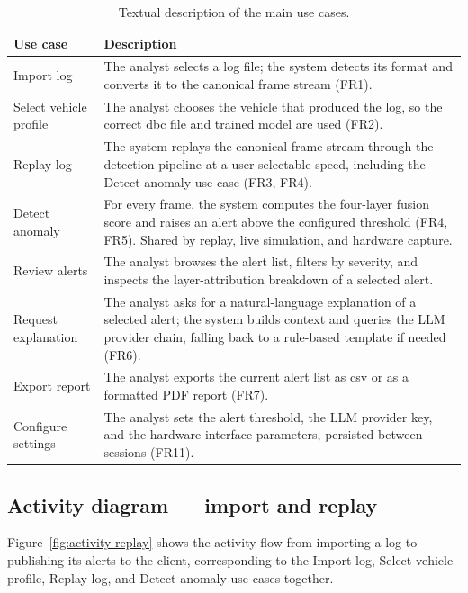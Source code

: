 \begin{table}[H]
\centering
\caption{Textual description of the main use cases.}
\label{tab:usecase-table}
\begin{tabularx}{\textwidth}{|p{3.2cm}|X|}
\hline
\textbf{Use case} & \textbf{Description} \\
\hline
Import log & The analyst selects a log file; the system detects its format and converts it to the canonical frame stream (FR1). \\
\hline
Select vehicle profile & The analyst chooses the vehicle that produced the log, so the correct \gls{dbc} file and trained model are used (FR2). \\
\hline
Replay log & The system replays the canonical frame stream through the detection pipeline at a user-selectable speed, including the Detect anomaly use case (FR3, FR4). \\
\hline
Detect anomaly & For every frame, the system computes the four-layer fusion score and raises an alert above the configured threshold (FR4, FR5). Shared by replay, live simulation, and hardware capture. \\
\hline
Review alerts & The analyst browses the alert list, filters by severity, and inspects the layer-attribution breakdown of a selected alert. \\
\hline
Request explanation & The analyst asks for a natural-language explanation of a selected alert; the system builds context and queries the LLM provider chain, falling back to a rule-based template if needed (FR6). \\
\hline
Export report & The analyst exports the current alert list as \gls{csv} or as a formatted PDF report (FR7). \\
\hline
Configure settings & The analyst sets the alert threshold, the LLM provider key, and the hardware interface parameters, persisted between sessions (FR11). \\
\hline
\end{tabularx}
\end{table}

\subsection{Activity diagram --- import and replay}

Figure~\ref{fig:activity-replay} shows the activity flow from importing a log to publishing its alerts to the client, corresponding to the Import log, Select vehicle profile, Replay log, and Detect anomaly use cases together.

